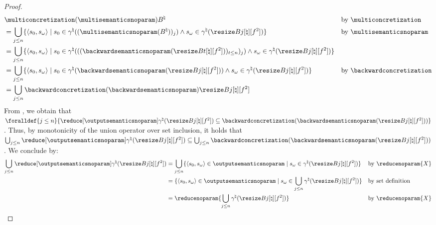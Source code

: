 \begin{proof}
  \begin{align*}
    &\vphantom{=} \multiconcretization(\multisemanticsnoparam)\buckets
      && \text{by $\multiconcretization$} \\
    &= \bigsetjoin_{j \le n}\setdef{\inputoutputtuple{\defstate}}{\retrieveinput{\defstate}\in\abstractdomainconcretization((\multisemanticsnoparam(\buckets))_j)\land\retrieveoutput{\defstate}\in\abstractdomainconcretization(\bucket)}
      && \text{by $\multisemanticsnoparam$} \\
    &= \bigsetjoin_{j \le n} \setdef{\inputoutputtuple{\defstate}}{\retrieveinput{\defstate}\in\abstractdomainconcretization(((\backwardsemanticsnoparam(\bucket[t]))_{t\le n})_j)\land\retrieveoutput{\defstate}\in\abstractdomainconcretization(\bucket)}
    && \\
    &= \bigsetjoin_{j \le n} \setdef{\inputoutputtuple{\defstate}}{\retrieveinput{\defstate}\in\abstractdomainconcretization(\backwardsemanticsnoparam(\bucket))\land\retrieveoutput{\defstate}\in\abstractdomainconcretization(\bucket)}
    && \text{by $\backwardconcretization$} \\
    &= \bigsetjoin_{j \le n} \backwardconcretization(\backwardsemanticsnoparam)\bucket
  \end{align*}
  From , we obtain that $\foralldef{j \le n}{\reducedoutputsemanticsnoparam \subseteq \backwardconcretization(\backwardsemanticsnoparam(\bucket))}$.
  Thus, by monotonicity of the union operator over set inclusion, it holds that $\bigsetjoin_{j\le n}\reducedoutputsemanticsnoparam \subseteq \bigsetjoin_{j\le n}\backwardconcretization(\backwardsemanticsnoparam(\bucket))$. We conclude by:
  \begin{align*}
    \bigsetjoin_{j\le n}\reducedoutputsemanticsnoparam &= \bigsetjoin_{j\le n} \setdef{\inputoutputtuple{\defstate}\in\outputsemanticsnoparam}{\retrieveoutput{\defstate}\in\abstractdomainconcretization(\bucket)}
      && \text{by $\reducenoparam{X}$} \\
    &= \setdef{\inputoutputtuple{\defstate}\in\outputsemanticsnoparam}{\retrieveoutput{\defstate}\in\bigsetjoin_{j \le n}\abstractdomainconcretization(\bucket)}
      && \text{by set definition} \\
    &= \reducenoparam{\bigsetjoin_{j \le n}\abstractdomainconcretization(\bucket)}
      && \text{by $\reducenoparam{X}$}
  \end{align*}
  \end{proof}

